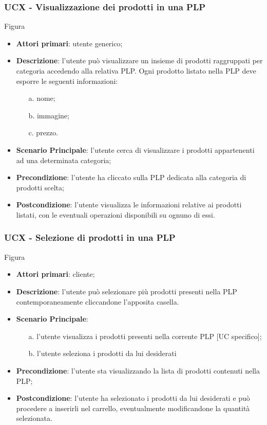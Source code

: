 \subsubsection{UCX - Visualizzazione dei prodotti in una PLP}
Figura \\
\begin{itemize}
\item \textbf{Attori primari}: utente generico;
\item \textbf{Descrizione}: l'utente può visualizzare un insieme di prodotti raggruppati per categoria accedendo alla relativa PLP. Ogni prodotto listato nella PLP deve esporre le seguenti informazioni:
\begin{enumerate}
\item[a.] nome;
\item[b.] immagine;
\item[c.] prezzo.
\end{enumerate}
\item \textbf{Scenario Principale}: l'utente cerca di visualizzare i prodotti appartenenti ad una determinata categoria;
\item \textbf{Precondizione}: l'utente ha cliccato sulla PLP dedicata alla categoria di prodotti scelta;
\item \textbf{Postcondizione}: l'utente visualizza le informazioni relative ai prodotti listati, con le eventuali operazioni disponibili su ognuno di essi.
\end{itemize}
\subsubsection{UCX - Selezione di prodotti in una PLP}
Figura \\
\begin{itemize}
\item \textbf{Attori primari}: cliente;
\item \textbf{Descrizione}: l'utente può selezionare più prodotti presenti nella PLP contemporaneamente cliccandone l'apposita casella.
\item \textbf{Scenario Principale}:
\begin{enumerate}
\item[a.] l'utente visualizza i prodotti presenti nella corrente PLP [UC specifico];
\item[b.] l'utente seleziona i prodotti da lui desiderati
\end{enumerate}
\item \textbf{Precondizione}: l'utente sta visualizzando la lista di prodotti contenuti nella PLP;
\item \textbf{Postcondizione}: l'utente ha selezionato i prodotti da lui desiderati e può procedere a inserirli nel carrello, eventualmente modificandone la quantità selezionata.
\end{itemize}
